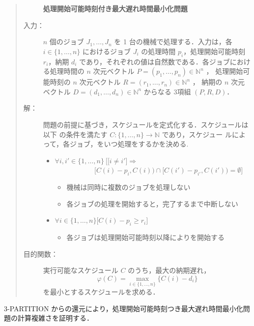 \documentclass[12pt]{optlab-bachelor}
\begin{document}
\begin{quote}
  \begin{description}
    \item[] {\bf 処理開始可能時刻付き最大遅れ時間最小化問題}
    \item[入力：] $n$ 個のジョブ $J_1,\ldots,J_n$ を 1 台の機械で処理する．入力は，各 $i \in \{1,\ldots,n\}$ におけるジョブ $J_i$ の処理時間 $p_i$，処理開始可能時刻
    $r_i$，納期 $d_i$ であり，それぞれの値は自然数である．各ジョブにおける処理時間の $n$ 次元ベクトル $P = (p_1,\ldots,p_n) \in \mathbb{N}^n$ ，
    処理開始可能時刻の $n$ 次元ベクトル $R = (r_1,\ldots,r_n) \in \mathbb{N}^n$ ，
    納期の $n$ 次元ベクトル $D = (d_1,\ldots,d_n) \in \mathbb{N}^n$ からなる 3項組 $(P,R,D)$．
    \item[解：] 問題の前提に基づき，スケジュールを定式化する．スケジュールは以下
    の条件を満たす $C : \{1,\ldots,n\} \to \mathbb{N}$ であり，スケジュー
    ルによって，各ジョブ，をいつ処理をするかを決める.
    \begin{itemize}
      \item $\forall i, i' \in \{1,\ldots,n\}\ \Big[ \big[i \neq i' \big] \Rightarrow$ \\ $~~~~~~~~~~~~~~~~~~~~~~~~~~[C(i) - p_i, C(i)) \cap [C(i') - p_{i'}, C(i')) = \emptyset \Big]$
      \begin{itemize}
        \item 機械は同時に複数のジョブを処理しない
        \item 各ジョブの処理を開始すると，完了するまで中断しない
      \end{itemize}
      \item  $\forall i \in \{1,\ldots,n\}\big[C(i) - p_i \ge r_i\big]$
      \begin{itemize}
        \item 各ジョブは処理開始可能時刻以降によりを開始する
      \end{itemize}
    \end{itemize}
    \item[目的関数：] 実行可能なスケジュール $C$ のうち，最大の納期遅れ，
    \begin{displaymath}
      \varphi(C) = \max_{i \in \{1,\ldots,n\}}\{C(i) - d_i\}
    \end{displaymath}
    を最小とするスケジュールを求める．
  \end{description}
\end{quote}

\textsc{3-PARTITION} からの還元により，処理開始可能時刻つき最大遅れ時間最小化問題の計算複雑さを証明する．
\end{document}
